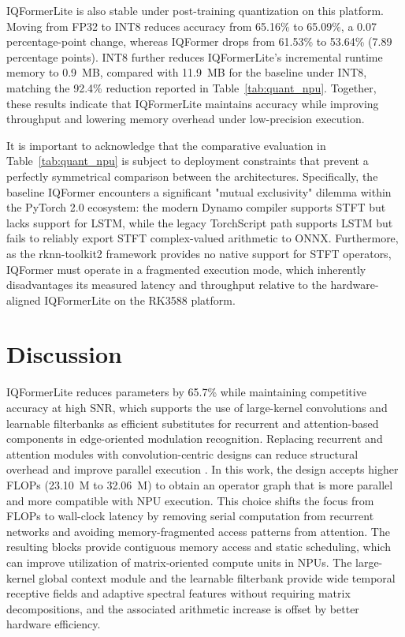 \documentclass{article}
\begin{document}
	IQFormerLite is also stable under post-training quantization on this platform. Moving from FP32 to INT8 reduces accuracy from 65.16\% to 65.09\%, a 0.07 percentage-point change, whereas IQFormer drops from 61.53\% to 53.64\% (7.89 percentage points). INT8 further reduces IQFormerLite's incremental runtime memory to 0.9~MB, compared with 11.9~MB for the baseline under INT8, matching the 92.4\% reduction reported in Table~\ref{tab:quant_npu}. Together, these results indicate that IQFormerLite maintains accuracy while improving throughput and lowering memory overhead under low-precision execution.
	
	It is important to acknowledge that the comparative evaluation in Table~\ref{tab:quant_npu} is subject to deployment constraints that prevent a perfectly symmetrical comparison between the architectures. Specifically, the baseline IQFormer encounters a significant "mutual exclusivity" dilemma within the PyTorch 2.0 ecosystem: the modern Dynamo compiler supports STFT but lacks support for LSTM, while the legacy TorchScript path supports LSTM but fails to reliably export STFT complex-valued arithmetic to ONNX. Furthermore, as the rknn-toolkit2 framework provides no native support for STFT operators, IQFormer must operate in a fragmented execution mode, which inherently disadvantages its measured latency and throughput relative to the hardware-aligned IQFormerLite on the RK3588 platform.
	
	
	\section{Discussion}
	\label{sec:discussion}
	
	IQFormerLite reduces parameters by 65.7\% while maintaining competitive accuracy at high SNR, which supports the use of large-kernel convolutions and learnable filterbanks as efficient substitutes for recurrent and attention-based components in edge-oriented modulation recognition.
	Replacing recurrent and attention modules with convolution-centric designs can reduce structural overhead and improve parallel execution \cite{kim2025comprehensivesurvey}.
	In this work, the design accepts higher FLOPs (23.10~M to 32.06~M) to obtain an operator graph that is more parallel and more compatible with NPU execution.
	This choice shifts the focus from FLOPs to wall-clock latency by removing serial computation from recurrent networks and avoiding memory-fragmented access patterns from attention.
	The resulting blocks provide contiguous memory access and static scheduling, which can improve utilization of matrix-oriented compute units in NPUs.
	The large-kernel global context module and the learnable filterbank provide wide temporal receptive fields and adaptive spectral features without requiring matrix decompositions, and the associated arithmetic increase is offset by better hardware efficiency.
	
\end{document}
